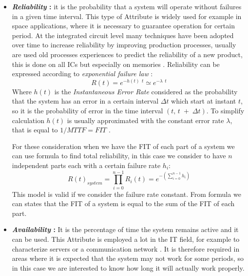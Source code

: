 {{{{\begin{itemize}
					\item \textbf{\textit{Reliability} : } it is the probability that a system will operate without failures in a given time interval. This type of Attribute is widely used for example in space applications, where it is necessary to guarantee operation for certain period.  At the integrated circuit level many techniques have been adopted over time to increase reliability by improving production processes, usually are used old processes experiences to predict the reliability of a new product, this is done on all ICs but especially on memories . Reliability can be expressed according to \textit{exponential failure law} :
					\begin{equation} \label{Reliability1}
						R(t)= e^{-h(t) \:\: t} \simeq e^{-\lambda \:\: t} 
					\end{equation} 
					Where $h(t)$ is the \textit{Instantaneous Error Rate} considered as the probability that the system has an error in a certain interval $\Delta t$ which start at instant $t$, so it is the probability of error in the time interval $(t,\, t\;+\;\Delta t )$. To simplify calculation $h(t)$ is usually approximated with the constant error rate $\lambda$, that is equal to $1/MTTF = FIT$ .
					
					For these consideration when we have the FIT of each part of a system we can use formula  to find total reliability, in this  case we consider to have $n$ independent parts each with a certain failure rate $h_i$:
					\begin{equation} \label{Reliability2}
						R(t)_{system} = \prod_{i=0}^{n-1}R_i(t) = e^{-\left(\sum_{i=0}^{n-1}h_i\right)}
					\end{equation}
					This model is valid if we consider the failure rate constant. From formula   we can states that the FIT of a system is equal to the sum of the FIT of each part.
					
					\item \textbf{\textit{Availability} : } It is the percentage of time the system remains active and it can be used. This Attribute is employed a lot in the IT field, for example to characterize servers or a communication network   . It is therefore required in areas where it is expected that the system may not work for some periods, so in this case we are interested to know how long it will actually work properly. 
					

\end{itemize}}}}}
